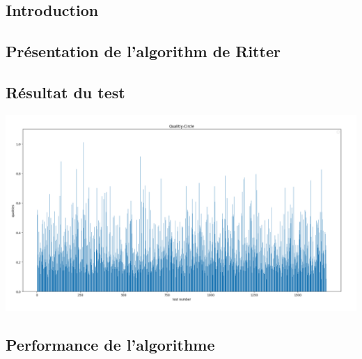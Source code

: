 \documentclass[14px]{article}
\begin{document}
\subsection{Introduction}

\subsection{Présentation de l'algorithm de Ritter}

\subsection{Résultat du test}
\includegraphics[width=\textwidth]{quality_circle.png}\\
\subsection{Performance de l'algorithme}
\end{document}
